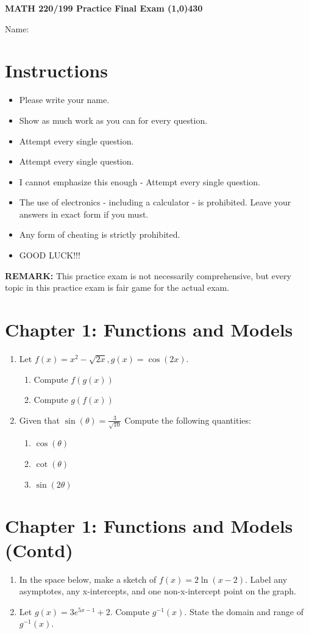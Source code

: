 \documentclass{article}
\begin{document}
\begin{center}
 \LARGE\bfseries MATH 220/199 Practice Final Exam
 \line(1,0){430}
\end{center}
Name:
\section*{Instructions}
\begin{itemize}
    \item Please write your name.
    \item Show as much work as you can for every question.
    \item Attempt every single question.
    \item Attempt every single question.
    \item I cannot emphasize this enough - Attempt every single question.
    \item The use of electronics - including a calculator - is prohibited. Leave your answers in exact form if you must.
    \item Any form of cheating is strictly prohibited.
    \item GOOD LUCK!!!
\end{itemize}
\textbf{REMARK:} This practice exam is not necessarily comprehensive, but every topic in this practice exam is fair game for the actual exam.
\newpage
\section*{Chapter 1: Functions and Models}
\begin{enumerate}
    \item Let $f(x) = x^2-\sqrt{2x}, g(x) = \cos(2x)$.
    \begin{enumerate}
        \item Compute $f(g(x))$
        \item Compute $g(f(x))$
    \end{enumerate}
    \vfill
    \item Given that $\sin(\theta) = \frac{3}{\sqrt{10}}$ Compute the following quantities:
    \begin{enumerate}
        \item $\cos(\theta)$
        \item $\cot(\theta)$
        \item $\sin(2\theta)$
    \end{enumerate}
    \vfill
\end{enumerate}
\newpage
\section*{Chapter 1: Functions and Models (Contd)}
\begin{enumerate}
    \item In the space below, make a sketch of $f(x) = 2\ln(x-2)$. Label any asymptotes, any x-intercepts, and one non-x-intercept point on the graph.
    \vfill
    \item Let $g(x) = 3e^{5x-1}+2$. Compute $g^{-1}(x)$. State the domain and range of $g^{-1}(x)$.
    \vfill
\end{enumerate}
\newpage
\end{document}
